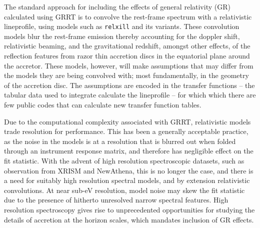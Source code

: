 \documentclass[fleqn,usenatbib]{mnras}
\begin{document}
The standard approach for including the effects of general relativity (GR)
calculated using GRRT is to  convolve the rest-frame spectrum with a
relativistic lineprofile, using models such as \texttt{relxill} and its
variants. These convolution models blur the rest-frame emission thereby
accounting for the doppler shift, relativistic beaming, and the gravitational
redshift, amongst other effects, of the reflection features from razor thin
accretion discs in the equatorial plane around the accretor. These models,
however, will make assumptions that may differ from the models they are being
convolved with; most fundamentally, in the geometry of the accretion disc. The
assumptions are encoded in the transfer functions -- the tabular data used to
integrate calculate the lineprofile -- for which which there are few public
codes that can calculate new transfer function tables.

Due to the computational complexity associated with GRRT, relativistic models
trade resolution for performance. This has been a generally acceptable practice,
as the noise in the models is at a resolution that is blurred out when folded
through an instrument response matrix, and therefore has negligible effect on
the fit statistic. With the advent of high resolution spectroscopic datasets,
such as observation from XRISM and NewAthena, this is no longer the case, and
there is a need for suitably high resolution spectral models, and by extension
relativistic convolutions. At near sub-eV resolution, model noise may skew the
fit statistic due to the presence of hitherto unresolved narrow spectral
features. High resolution spectroscopy gives rise to unprecedented opportunities
for studying the details of accretion at the horizon scales, which mandates
inclusion of GR effects.
\end{document}
